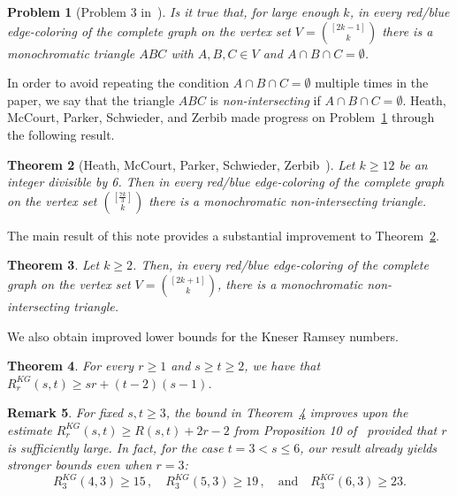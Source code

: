 \documentclass[11pt]{amsart}
\newtheorem{theorem}{Theorem}[section]
\newtheorem{remark}[theorem]{Remark}
\newtheorem{problem}[theorem]{Problem}
\begin{document}
\begin{problem}[Problem 3 in~\cite{heath}] \label{prob}
    Is it true that, for large enough $k$, in every red/blue edge-coloring of the complete graph on the vertex set $V = \binom{[2k-1]}{k}$ there is a monochromatic triangle $ABC$ with $A,B,C \in V$ and $A \cap B \cap C = \emptyset$.
\end{problem}

In order to avoid repeating the condition $A \cap B \cap C = \emptyset$ multiple times in the paper, we say that the triangle $ABC$ is \emph{non-intersecting} if $A \cap B \cap C = \emptyset$.
Heath, McCourt, Parker, Schwieder, and Zerbib made progress on Problem~\ref{prob} through the following result.

\begin{theorem}[Heath, McCourt, Parker, Schwieder, Zerbib~\cite{heath}] \label{thm:heath}
    Let $k \ge 12$ be an integer divisible by 6. Then in every red/blue edge-coloring of the complete graph on the vertex set $\binom{[\frac{7k}{3}]}{k}$ there is a monochromatic non-intersecting triangle.
\end{theorem}

The main result of this note provides a substantial improvement to Theorem~\ref{thm:heath}.

\begin{theorem}\label{thm:main}
    Let $k \ge 2$. Then, in every red/blue edge-coloring of the complete graph on the vertex set $V = \binom{[2k+1]}{k}$, there is a monochromatic non-intersecting triangle.
\end{theorem}

We also obtain improved lower bounds for the Kneser Ramsey numbers.

\begin{theorem}\label{thm:kneser}
    For every $r\ge 1$ and $s\ge t\ge 2$, we have that $R_r^{KG}(s,t) \ge sr + (t-2)(s-1)$.
\end{theorem}

\begin{remark}
    For fixed $s,t\ge 3$, the bound in Theorem~\ref{thm:kneser} improves upon the estimate $R_r^{KG}(s,t) \ge R(s,t) + 2r-2 $ from Proposition 10 of~\cite{heath} provided that $r$ is sufficiently large.
    In fact, for the case $t=3 < s \le 6$, our result already yields stronger bounds even when $r=3$:
$$ R_3^{KG}(4,3) \ge 15 \, ,  \quad  R_3^{KG}(5,3) \ge 19 \, , \quad \text{and} \quad R_3^{KG}(6,3) \ge 23 .$$
\end{remark}
\end{document}
